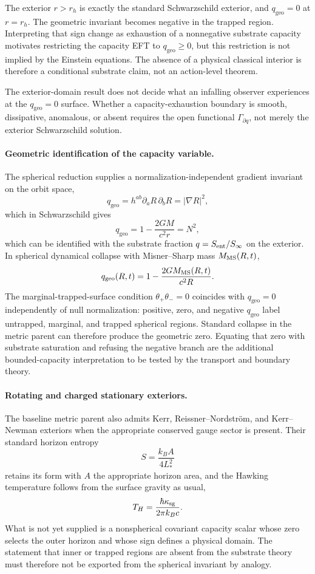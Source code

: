 \documentclass[11pt]{article}
\begin{document}
The exterior $r>r_h$ is exactly the standard Schwarzschild exterior, and $q_{\mathrm{geo}}=0$ at $r=r_h$. The geometric invariant becomes negative in the trapped region. Interpreting that sign change as exhaustion of a nonnegative substrate capacity motivates restricting the capacity EFT to $q_{\mathrm{geo}}\geq0$, but this restriction is not implied by the Einstein equations. The absence of a physical classical interior is therefore a conditional substrate claim, not an action-level theorem.

The exterior-domain result does not decide what an infalling observer experiences at the $q_{\mathrm{geo}}=0$ surface. Whether a capacity-exhaustion boundary is smooth, dissipative, anomalous, or absent requires the open functional $\Gamma_{\partial q}$, not merely the exterior Schwarzschild solution.

\paragraph{Geometric identification of the capacity variable.}
The spherical reduction supplies a normalization-independent gradient invariant on the orbit space,
\[
q_{\mathrm{geo}}=h^{ab}\partial_a R\,\partial_b R=|\nabla R|^2,
\]
which in Schwarzschild gives
\[
q_{\mathrm{geo}}=1-\frac{2GM}{c^2r}=N^2,
\]
which can be identified with the substrate fraction $q=S_{\rm ent}/S_\infty$ on the exterior. In spherical dynamical collapse with Misner--Sharp mass $M_{\rm MS}(R,t)$,
\[
q_{\mathrm{geo}}(R,t)=1-\frac{2GM_{\rm MS}(R,t)}{c^2R}.
\]
The marginal-trapped-surface condition $\theta_+\theta_-=0$ coincides with $q_{\mathrm{geo}}=0$ independently of null normalization: positive, zero, and negative $q_{\mathrm{geo}}$ label untrapped, marginal, and trapped spherical regions. Standard collapse in the metric parent can therefore produce the geometric zero. Equating that zero with substrate saturation and refusing the negative branch are the additional bounded-capacity interpretation to be tested by the transport and boundary theory.

\paragraph{Rotating and charged stationary exteriors.}
The baseline metric parent also admits Kerr, Reissner--Nordstr\"om, and Kerr--Newman exteriors when the appropriate conserved gauge sector is present. Their standard horizon entropy
\[
S=\frac{k_BA}{4L_*^2}
\]
retains its form with $A$ the appropriate horizon area, and the Hawking temperature follows from the surface gravity as usual,
\[
T_H=\frac{\hbar \kappa_{\rm sg}}{2\pi k_Bc}.
\]
What is not yet supplied is a nonspherical covariant capacity scalar whose zero selects the outer horizon and whose sign defines a physical domain. The statement that inner or trapped regions are absent from the substrate theory must therefore not be exported from the spherical invariant by analogy.
\end{document}
